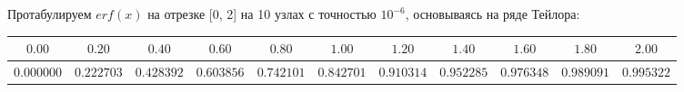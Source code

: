 Протабулируем $erf(x)$ на отрезке [0, 2] на 10 узлах с точностью $10^{-6}$, основываясь на ряде Тейлора:\\
\begin{tabular}{ccccccccccc}
\hline
$0.00$&$0.20$&$0.40$&$0.60$&$0.80$&$1.00$&$1.20$&$1.40$&$1.60$&$1.80$&$2.00$\\
\hline
$0.000000$&$0.222703$&$0.428392$&$0.603856$&$0.742101$&$0.842701$&$0.910314$&$0.952285$&$0.976348$&$0.989091$&$0.995322$\\
\end{tabular}